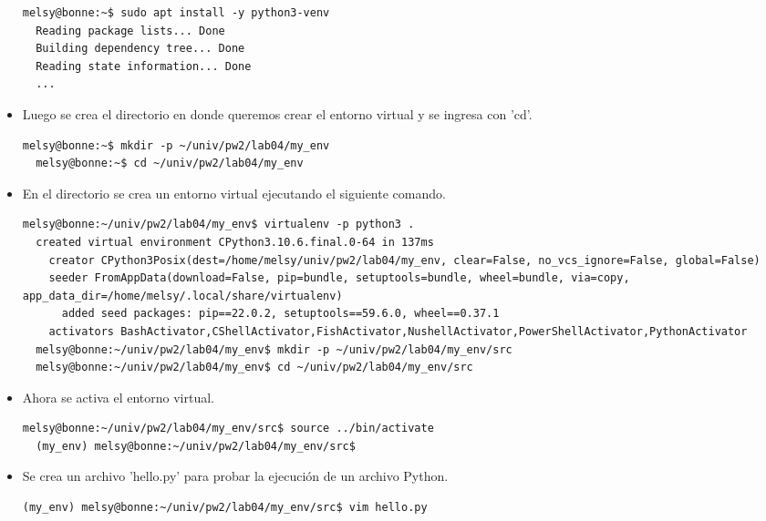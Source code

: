 \documentclass{article}
\begin{document}
\begin{itemize}
  \begin{lstlisting}[style=shell]
  melsy@bonne:~$ sudo apt install -y python3-venv
  Reading package lists... Done
  Building dependency tree... Done
  Reading state information... Done
  ...
  \end{lstlisting}
  
  \item Luego se crea el directorio en donde queremos crear el entorno virtual y se ingresa con 'cd'.

  \begin{lstlisting}[style=shell]
  melsy@bonne:~$ mkdir -p ~/univ/pw2/lab04/my_env
  melsy@bonne:~$ cd ~/univ/pw2/lab04/my_env
  \end{lstlisting}
  
  \item En el directorio se crea un entorno virtual ejecutando el siguiente comando.

  \begin{lstlisting}[style=shell]
  melsy@bonne:~/univ/pw2/lab04/my_env$ virtualenv -p python3 .
  created virtual environment CPython3.10.6.final.0-64 in 137ms
    creator CPython3Posix(dest=/home/melsy/univ/pw2/lab04/my_env, clear=False, no_vcs_ignore=False, global=False)
    seeder FromAppData(download=False, pip=bundle, setuptools=bundle, wheel=bundle, via=copy, app_data_dir=/home/melsy/.local/share/virtualenv)
      added seed packages: pip==22.0.2, setuptools==59.6.0, wheel==0.37.1
    activators BashActivator,CShellActivator,FishActivator,NushellActivator,PowerShellActivator,PythonActivator
  melsy@bonne:~/univ/pw2/lab04/my_env$ mkdir -p ~/univ/pw2/lab04/my_env/src
  melsy@bonne:~/univ/pw2/lab04/my_env$ cd ~/univ/pw2/lab04/my_env/src
  \end{lstlisting}
  
  \item Ahora se activa el entorno virtual.

  \begin{lstlisting}[style=shell]
  melsy@bonne:~/univ/pw2/lab04/my_env/src$ source ../bin/activate
  (my_env) melsy@bonne:~/univ/pw2/lab04/my_env/src$
  \end{lstlisting}
  
  \item Se crea un archivo 'hello.py' para probar la ejecución de un archivo Python.

  \begin{lstlisting}[style=shell]
  (my_env) melsy@bonne:~/univ/pw2/lab04/my_env/src$ vim hello.py
  \end{lstlisting}
  

\end{itemize}
\end{document}
